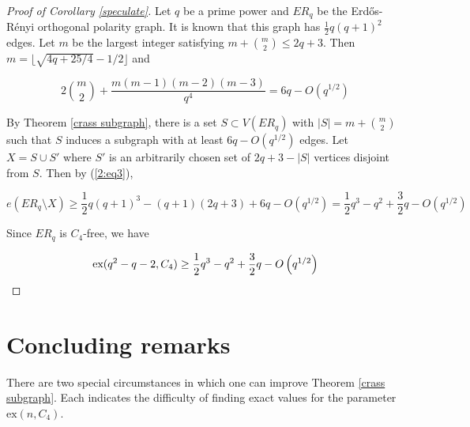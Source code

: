\documentclass[12pt]{article}
\begin{document}
\begin{proof}[Proof of Corollary \ref{speculate}]
    Let $q$ be a prime power and $ER_q$ be the Erd\H{o}s-R\'{e}nyi orthogonal polarity graph.  It is known that this graph has
    $\frac{1}{2}q(q+1)^2$ edges.  Let $m$ be the largest integer satisfying $m+\binom{m}{2} \leq 2q+3$.
    Then $m = \lfloor \sqrt{4q + 25/4}  - 1/2 \rfloor$ and

    $$ 2 \binom{m}{2} + \frac{ m (m - 1)(m-2)(m-3) }{q^4} = 6q - O(q^{1/2} ) $$

    By Theorem \ref{crass subgraph}, there is a set $S \subset V(ER_q)$ with $|S| = m + \binom{m}{2}$ such that
    $S$ induces a subgraph with at least $6q - O (q^{1/2})$ edges.  Let $X = S \cup S'$ where $S'$ is an arbitrarily chosen set of
    $2q + 3 - |S|$ vertices disjoint from $S$.  Then by (\ref{2:eq3}),

    $$ e( ER_q \setminus X) \geq \frac{1}{2}q(q+1)^3 - (q+1)(2q +3) + 6q - O(q^{1/2} ) =  \frac{1}{2}q^3 - q^2 + \frac{3}{2}q - O\left(q^{1/2}\right) $$

    Since $ER_q$ is $C_4$-free, we have

    $$ \textup{ex}( q^2 - q - 2 , C_4)  \geq \frac{1}{2}q^3 - q^2 + \frac{3}{2}q - O\left(q^{1/2}\right) $$
\end{proof}


\section{Concluding remarks}\label{remark}


There are two special circumstances in which one can improve Theorem \ref{crass subgraph}. Each indicates the difficulty of finding exact values for the parameter $\mathrm{ex}(n, C_4)$.
\end{document}
